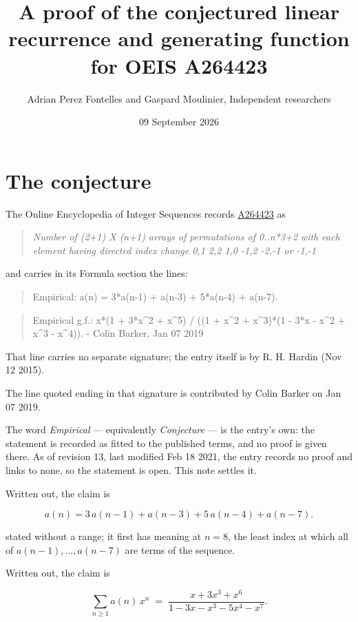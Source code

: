 \documentclass[11pt]{article}
\title{A proof of the conjectured linear recurrence and generating function for OEIS A264423}
\author{Adrian Perez Fontelles and Gaspard Moulinier, Independent researchers}
\date{09 September 2026}
\theoremstyle{definition}
\begin{document}
\maketitle
\section{The conjecture}

The Online Encyclopedia of Integer Sequences records \href{https://oeis.org/A264423}{A264423} as

\begin{quote}\itshape Number of (2+1) X (n+1) arrays of permutations of 0..n*3+2 with each element having directed index change 0,1 2,2 1,0 -1,2 -2,-1 or -1,-1\end{quote}

and carries in its Formula section the lines:

\begin{quote}\ttfamily Empirical: a(n) = 3*a(n-1) + a(n-3) + 5*a(n-4) + a(n-7).\end{quote}

\begin{quote}\ttfamily Empirical g.f.: x*(1 + 3*x\textasciicircum{}2 + x\textasciicircum{}5) / ((1 + x\textasciicircum{}2 + x\textasciicircum{}3)*(1 - 3*x - x\textasciicircum{}2 + x\textasciicircum{}3 - x\textasciicircum{}4)). - Colin Barker, Jan 07 2019\end{quote}

That line carries no separate signature; the entry itself is by R. H. Hardin (Nov 12 2015).

The line quoted ending in that signature is contributed by Colin Barker on Jan 07 2019.

The word {\itshape Empirical} --- equivalently {\itshape Conjecture} --- is the entry's own: the statement is recorded as fitted to the published terms, and no proof is given there. As of revision 13, last modified Feb 18 2021, the entry records no proof and links to none, so the statement is open. This note settles it.

Written out, the claim is

\[a(n) = 3\,a(n-1) + a(n-3) + 5\,a(n-4) + a(n-7).\]

stated without a range; it first has meaning at $n = 8$, the least index at which all of $a(n-1),\dots,a(n-7)$ are terms of the sequence.

Written out, the claim is

\[\sum_{n \ge 1} a(n)\,x^n \;=\; \frac{x + 3x^{3} + x^{6}}{1 - 3x - x^{3} - 5x^{4} - x^{7}}.\]
\end{document}
